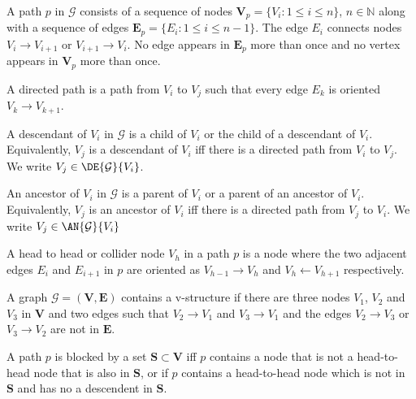 \begin{definition}
A path $p$ in $\mathcal{G}$ consists of a sequence of nodes $\mathbf{V}_p=\{V_i:1\leq i \leq n\}$, $n\in\mathbb{N}$ along with a sequence of edges $\mathbf{E}_p=\{E_i:1\leq i \leq n-1\}$. The edge $E_i$ connects nodes $V_i\to V_{i+1}$ or $V_{i+1}\to V_i$. No edge appears in $\mathbf{E}_p$ more than once and no vertex appears in $\mathbf{V}_p$ more than once.

A directed path is a path from $V_i$ to $V_j$ such that every edge $E_k$ is oriented  $V_k\to V_{k+1}$.
\end{definition}

\begin{definition}\label{def:descendants_and_ancestors}
A descendant of $V_i$ in $\mathcal{G}$ is a child of $V_i$ or the child of a descendant of $V_i$. Equivalently, $V_j$ is a descendant of $V_i$ iff there is a directed path from $V_i$ to $V_j$. We write $V_j\in \DE{\mathcal{G}}{V_i}$.

An ancestor of $V_i$ in $\mathcal{G}$ is a parent of $V_i$ or a parent of an ancestor of $V_i$. Equivalently, $V_j$ is an ancestor of $V_i$ iff there is a directed path from $V_j$ to $V_i$. We write $V_j\in \AN{\mathcal{G}}{V_i}$
\end{definition}

\begin{definition}
A head to head or collider node $V_{h}$ in a path $p$ is a node where the two adjacent edges $E_i$ and $E_{i+1}$ in $p$ are oriented as $V_{h-1}\rightarrow V_h$ and $V_h\leftarrow V_{h+1}$ respectively.
\end{definition}

\begin{definition}[V-structure]\label{def:v_structure}
A graph $\mathcal{G}=(\mathbf{V},\mathbf{E})$ contains a v-structure if there are three nodes $V_1$, $V_2$ and $V_3$ in $\mathbf{V}$ and two edges such that $V_2\to V_1$ and $V_3\to V_1$ and the edges $V_2\to V_3$ or $V_3\to V_2$ are not in $\mathbf{E}$.

\end{definition}

\begin{definition}
A path $p$ is blocked by a set $\mathbf{S}\subset \mathbf{V}$ iff $p$ contains a node that is not a head-to-head node that is also in $\mathbf{S}$, or if $p$ contains a head-to-head node which is not in $\mathbf{S}$ and has no a descendent in $\mathbf{S}$.
\end{definition}

